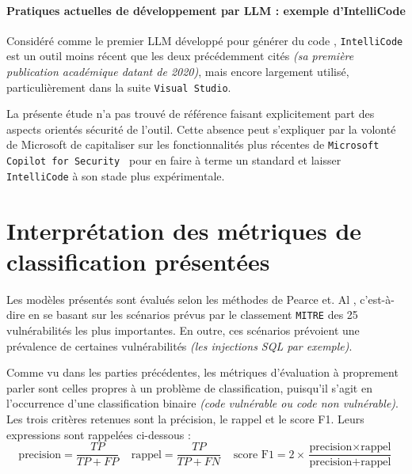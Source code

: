             \paragraph*{Pratiques actuelles de développement par LLM : exemple d'IntelliCode}
                Considéré comme le premier LLM développé pour générer du code \cite{citing3},
                \texttt{IntelliCode} est un outil moins récent que
                les deux
                précédemment
                cités \textit{(sa première publication académique datant de 2020\cite{IntelliCode})},
                mais encore largement utilisé, particulièrement dans la suite
                \texttt{Visual Studio}.

                La présente étude n'a pas trouvé de référence faisant explicitement part des
                aspects orientés sécurité de l'outil. Cette absence peut s'expliquer par la
                volonté de Microsoft de capitaliser sur les fonctionnalités plus récentes de \texttt{Microsoft Copilot
                for Security } pour en faire à terme un standard et laisser \texttt{IntelliCode}
                à son stade plus expérimentale.
    \section{Interprétation des métriques de classification présentées}\label{metriques}
            Les modèles présentés sont évalués selon les méthodes de Pearce et. Al \cite{38metrics},
        c'est-à-dire en se basant sur les scénarios prévus par le classement \texttt{MITRE} des 25
        vulnérabilités les plus importantes. En outre, ces scénarios prévoient une prévalence de
        certaines vulnérabilités \textit{(les injections SQL par exemple)}.

            Comme vu dans les parties précédentes, les métriques d'évaluation à proprement
        parler sont celles propres à un problème de classification, puisqu'il s'agit en
        l'occurrence d'une classification binaire 
\textit{(code vulnérable ou code non vulnérable)}. Les trois critères retenues sont la
précision, le rappel et le score F1. Leurs expressions sont rappelées ci-dessous :
        \begin{equation}
            \text{precision} = \frac{TP}{TP + FP} \;\;\;\; \text{rappel} = \frac{TP}{TP + FN} \;\;\;\; \text{score F1} = 2 \times \frac{\text{precision} \times \text{rappel}}{\text{precision} + \text{rappel}}
        \end{equation}

